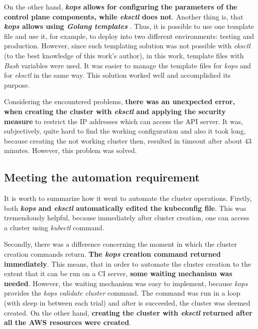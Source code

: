 On the other hand, \textbf{\textit{kops} allows for configuring the parameters of the control plane components, while \textit{eksctl} does not}. Another thing is, that \textbf{\textit{kops} allows using \textit{Golang templates}} \cite{online-kops-yaml-config-golang}. Thus, it is possible to use one template file and use it, for example, to deploy into two different environments: testing and production. However, since such templating solution was not possible with \textit{eksctl} (to the best knowledge of this work's author), in this work, template files with \textit{Bash} variables were used. It was easier to manage the template files for \textit{kops} and for \textit{eksctl} in the same way. This solution worked well and accomplished its purpose.

Considering the encountered problems, \textbf{there was an unexpected error, when creating the cluster with \textit{eksctl} and applying the security measure} to restrict the IP addresses which can access the API server. It was, subjectively, quite hard to find the working configuration and also it took long, because creating the not working cluster then, resulted in timeout after about 43 minutes. However, this problem was solved.


\subsection{Meeting the automation requirement}

It is worth to summarize how it went to automate the cluster operations. Firstly, both \textbf{\textit{kops} and \textit{eksctl} automatically edited the kubeconfig file}. This was tremendously helpful, because immediately after cluster creation, one can access a cluster using \textit{kubectl} command.

Secondly, there was a difference concerning the moment in which the cluster creation commands return. \textbf{The \textit{kops} creation command returned immediately}. This means, that in order to automate the cluster creation to the extent that it can be run on a CI server, \textbf{some waiting mechanism was needed}. However, the waiting mechanism was easy to implement, because \textit{kops} provides the \textit{kops validate cluster} command. The command was run in a loop (with sleep in between each trial) and after is succeeded, the cluster was deemed created. On the other hand, \textbf{creating the cluster with \textit{eksctl} returned after all the AWS resources were created}.

